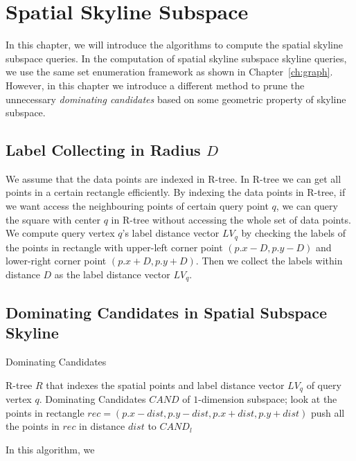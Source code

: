 
%
%

\chapter{Spatial Skyline Subspace}
\label{ch:spatial_skyline_subspace}

In this chapter, we will introduce the algorithms to compute the spatial skyline subspace queries. In the computation of spatial skyline subspace skyline queries, we use the same set enumeration framework as shown in Chapter~\ref{ch:graph}. However, in this chapter we introduce a different method to prune the unnecessary \emph{dominating candidates} based on some geometric property of skyline subspace.

\section{Label Collecting in Radius $D$}

We assume that the data points are indexed in R-tree. In R-tree we can get all points in a certain rectangle efficiently. By indexing the data points in R-tree, if we want access the neighbouring points of certain query point $q$, we can query the square with center $q$ in R-tree without accessing the whole set of data points. We compute query vertex $q$'s label distance vector $LV_q$ by checking the labels of the points in rectangle with upper-left corner point $(p.x - D, p.y - D)$ and lower-right corner point $(p.x + D, p.y + D)$. Then we collect the labels within distance $D$ as the label distance vector $LV_q$.

\section{Dominating Candidates in Spatial Subspace Skyline}

\begin{algorithm}[H]
  \caption{Dominating Candidates}\label{algo:blah}
  \begin{algorithmic}[1]
  \show\LOOP
    \REQUIRE R-tree $R$ that indexes the spatial points and label distance vector $LV_q$ of query vertex $q$.
    \ENSURE Dominating Candidates $CAND$ of $1$-dimension subspace;
            \STATE look at the points in rectangle $rec = (p.x-dist, p.y-dist, p.x+dist, p.y+dist)$
            \STATE push all the points in $rec$ in distance $dist$ to $CAND_l$
        \ENDFOR
    \ENDFOR
  \end{algorithmic}
\end{algorithm}

In this algorithm, we 




